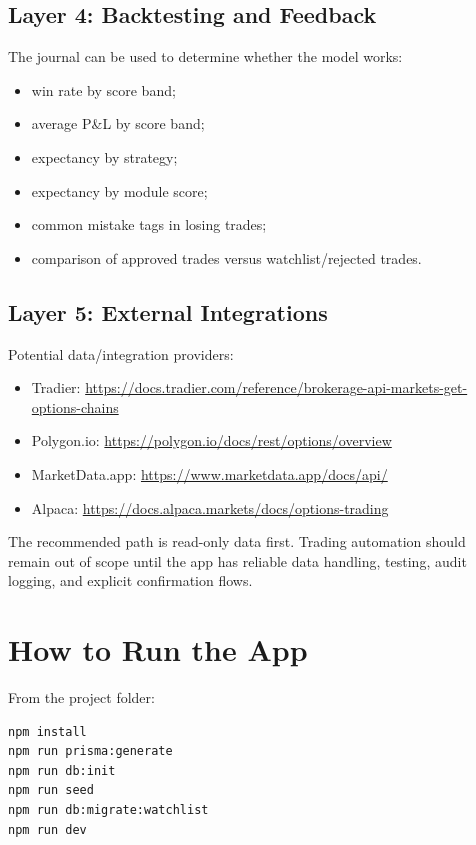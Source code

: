 \documentclass[11pt]{article}
\begin{document}
\subsection{Layer 4: Backtesting and Feedback}

The journal can be used to determine whether the model works:

\begin{itemize}[noitemsep]
  \item win rate by score band;
  \item average P\&L by score band;
  \item expectancy by strategy;
  \item expectancy by module score;
  \item common mistake tags in losing trades;
  \item comparison of approved trades versus watchlist/rejected trades.
\end{itemize}

\subsection{Layer 5: External Integrations}

Potential data/integration providers:

\begin{itemize}[noitemsep]
  \item Tradier: \url{https://docs.tradier.com/reference/brokerage-api-markets-get-options-chains}
  \item Polygon.io: \url{https://polygon.io/docs/rest/options/overview}
  \item MarketData.app: \url{https://www.marketdata.app/docs/api/}
  \item Alpaca: \url{https://docs.alpaca.markets/docs/options-trading}
\end{itemize}

The recommended path is read-only data first. Trading automation should remain out of scope until the app has reliable data handling, testing, audit logging, and explicit confirmation flows.

\section{How to Run the App}

From the project folder:

\begin{lstlisting}
npm install
npm run prisma:generate
npm run db:init
npm run seed
npm run db:migrate:watchlist
npm run dev
\end{lstlisting}
\end{document}
